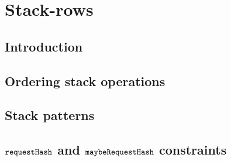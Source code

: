 \section{Stack-rows}
\subsection{Introduction \lispDone{}}                                                \label{hub: stack: intro}         
\subsection{Ordering stack operations \lispDone{}}                                   \label{hub: stack: order}         
\subsection{Stack patterns}                                                          \label{hub: stack: patterns}      
\subsection{$\texttt{requestHash}$ and $\texttt{maybeRequestHash}$ constraints \lispDone{}}  \label{hub: stack: request hash}  
